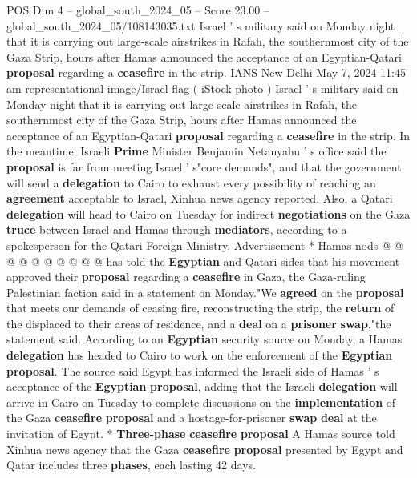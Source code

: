 \begin{textsample}{POS Dim 4 – global\_south\_2024\_05 – Score 23.00 – global\_south\_2024\_05/108143035.txt}  \label{ex:f4_pos_186}
Israel ' s military said on Monday night that it is carrying out large-scale airstrikes in Rafah, the southernmost city of the Gaza Strip, hours after Hamas announced the acceptance of an Egyptian-Qatari \textbf{proposal} regarding a \textbf{ceasefire} in the strip.
IANS New Delhi May 7, 2024 11:45 am representational image/Israel flag ( iStock photo ) Israel ' s military said on Monday night that it is carrying out large-scale airstrikes in Rafah, the southernmost city of the Gaza Strip, hours after Hamas announced the acceptance of an Egyptian-Qatari \textbf{proposal} regarding a \textbf{ceasefire} in the strip.
In the meantime, Israeli \textbf{Prime} Minister Benjamin Netanyahu ' s office said the \textbf{proposal} is far from meeting Israel ' s"core demands", and that the government will send a \textbf{delegation} to Cairo to exhaust every possibility of reaching an \textbf{agreement} acceptable to Israel, Xinhua news agency reported.
Also, a Qatari \textbf{delegation} will head to Cairo on Tuesday for indirect \textbf{negotiations} on the Gaza \textbf{truce} between Israel and Hamas through \textbf{mediators}, according to a spokesperson for the Qatari Foreign Ministry.
Advertisement * Hamas nods @ @ @ @ @ @ @ @ @ @ has told the \textbf{Egyptian} and Qatari sides that his movement approved their \textbf{proposal} regarding a \textbf{ceasefire} in Gaza, the Gaza-ruling Palestinian faction said in a statement on Monday."We \textbf{agreed} on the \textbf{proposal} that meets our demands of ceasing fire, reconstructing the strip, the \textbf{return} of the displaced to their areas of residence, and a \textbf{deal} on a \textbf{prisoner} \textbf{swap},"the statement said.
According to an \textbf{Egyptian} security source on Monday, a Hamas \textbf{delegation} has headed to Cairo to work on the enforcement of the \textbf{Egyptian} \textbf{proposal}.
The source said Egypt has informed the Israeli side of Hamas ' s acceptance of the \textbf{Egyptian} \textbf{proposal}, adding that the Israeli \textbf{delegation} will arrive in Cairo on Tuesday to complete discussions on the \textbf{implementation} of the Gaza \textbf{ceasefire} \textbf{proposal} and a hostage-for-prisoner \textbf{swap} \textbf{deal} at the invitation of Egypt. * \textbf{Three-phase} \textbf{ceasefire} \textbf{proposal} A Hamas source told Xinhua news agency that the Gaza \textbf{ceasefire} \textbf{proposal} presented by Egypt and Qatar includes three \textbf{phases}, each lasting 42 days.

\end{textsample}
